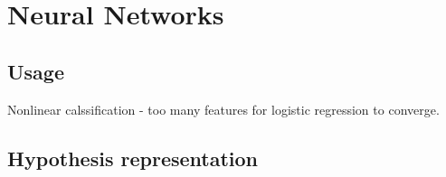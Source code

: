 \section{Neural Networks}


\subsection{Usage}
    Nonlinear calssification - too many features for logistic regression to converge.

\subsection{Hypothesis representation}
    